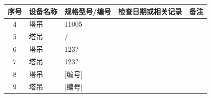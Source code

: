 \documentclass[UTF8,10pt,a4paper,fontset=fandol]{ctexart}
\newcommand{\fieldvalue}[1]{#1}
\newcommand{\handwritten}[1]{#1}
\begin{document}
\begin{table}[h]
\centering
\small
\begin{tabularx}{\textwidth}{|c|X|X|X|c|}
\hline
序号 & 设备名称 & 规格型号/编号 & 检查日期或相关记录 & 备注 \\
\hline
4 &
塔吊 &
\fieldvalue{\handwritten{11005}} &
\fieldvalue{\handwritten{\checkmark}} &
\\
\hline
5 &
塔吊 &
\fieldvalue{\handwritten{/}} &
\fieldvalue{\handwritten{\checkmark}} &
\\
\hline
6 &
塔吊 &
\fieldvalue{\handwritten{123?}} &
\fieldvalue{\handwritten{\checkmark}} &
\\
\hline
7 &
塔吊 &
\fieldvalue{\handwritten{123?}} &
\fieldvalue{\handwritten{\checkmark}} &
\\
\hline
8 &
塔吊 &
\fieldvalue{\handwritten{[编号]}} &
\fieldvalue{\handwritten{\checkmark}} &
\\
\hline
9 &
塔吊 &
\fieldvalue{\handwritten{[编号]}} &
\fieldvalue{\handwritten{\checkmark}} &
\\
\hline
\end{tabularx}
\end{table}

\vspace{1em}
\end{document}
